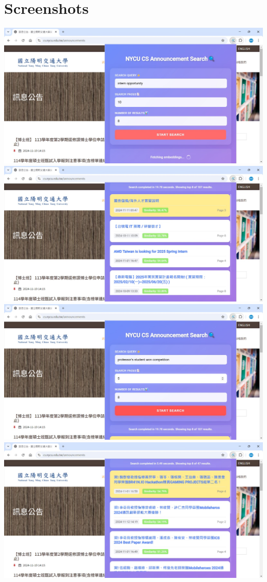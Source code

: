 \section{Screenshots}
\includegraphics[width=\textwidth]{screenshots/sc1.jpeg}
\includegraphics[width=\textwidth]{screenshots/sc2.jpeg}
\includegraphics[width=\textwidth]{screenshots/sc3.jpeg}
\includegraphics[width=\textwidth]{screenshots/sc4.jpeg}
